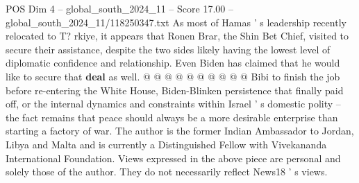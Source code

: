 \begin{textsample}{POS Dim 4 – global\_south\_2024\_11 – Score 17.00 – global\_south\_2024\_11/118250347.txt}
As most of Hamas ' s leadership recently relocated to T? rkiye, it appears that Ronen Brar, the Shin Bet Chief, visited to secure their assistance, despite the two sides likely having the lowest level of diplomatic confidence and relationship.
Even Biden has claimed that he would like to secure that \textbf{deal} as well. @ @ @ @ @ @ @ @ @ @ Bibi to finish the job before re-entering the White House, Biden-Blinken persistence that finally paid off, or the internal dynamics and constraints within Israel ' s domestic polity -- the fact remains that peace should always be a more desirable enterprise than starting a factory of war.
The author is the former Indian Ambassador to Jordan, Libya and Malta and is currently a Distinguished Fellow with Vivekananda International Foundation.
Views expressed in the above piece are personal and solely those of the author.
They do not necessarily reflect News18 ' s views.

\end{textsample}
